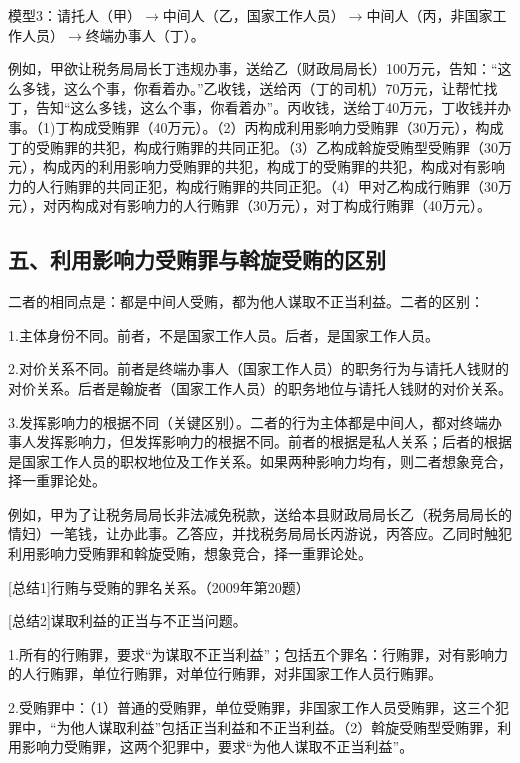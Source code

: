 模型3：请托人（甲）\ensuremath{\rightarrow}中间人（乙，国家工作人员）\ensuremath{\rightarrow}中间人（丙，非国家工作人员）\ensuremath{\rightarrow}终端办事人（丁）。

例如，甲欲让税务局局长丁违规办事，送给乙（财政局局长）100万元，告知：“这么多钱，这么个事，你看着办。”乙收钱，送给丙（丁的司机）70万元，让帮忙找丁，告知“这么多钱，这么个事，你看着办”。丙收钱，送给丁40万元，丁收钱并办事。（1)丁构成受贿罪（40万元）。（2）丙构成利用影响力受贿罪（30万元），构成丁的受贿罪的共犯，构成行贿罪的共同正犯。（3）乙构成斡旋受贿型受贿罪（30万元），构成丙的利用影响力受贿罪的共犯，构成丁的受贿罪的共犯，构成对有影响力的人行贿罪的共同正犯，构成行贿罪的共同正犯。（4）甲对乙构成行贿罪（30万元），对丙构成对有影响力的人行贿罪（30万元），对丁构成行贿罪（40万元）。

\subsection*{五、利用影响力受贿罪与斡旋受贿的区别}

二者的相同点是：都是中间人受贿，都为他人谋取不正当利益。二者的区别：

1.主体身份不同。前者，不是国家工作人员。后者，是国家工作人员。

2.对价关系不同。前者是终端办事人（国家工作人员）的职务行为与请托人钱财的对价关系。后者是翰旋者（国家工作人员）的职务地位与请托人钱财的对价关系。

3.发挥影响力的根据不同（关键区别）。二者的行为主体都是中间人，都对终端办事人发挥影响力，但发挥影响力的根据不同。前者的根据是私人关系；后者的根据是国家工作人员的职权地位及工作关系。如果两种影响力均有，则二者想象竞合，择一重罪论处。

例如，甲为了让税务局局长非法减免税款，送给本县财政局局长乙（税务局局长的情妇）一笔钱，让办此事。乙答应，并找税务局局长丙游说，丙答应。乙同时触犯利用影响力受贿罪和斡旋受贿，想象竞合，择一重罪论处。

[总结1]行贿与受贿的罪名关系。（2009年第20题）


[总结2]谋取利益的正当与不正当问题。

1.所有的行贿罪，要求“为谋取不正当利益”；包括五个罪名：行贿罪，对有影响力的人行贿罪，单位行贿罪，对单位行贿罪，对非国家工作人员行贿罪。

2.受贿罪中：（1）普通的受贿罪，单位受贿罪，非国家工作人员受贿罪，这三个犯罪中，“为他人谋取利益”包括正当利益和不正当利益。（2）斡旋受贿型受贿罪，利用影响力受贿罪，这两个犯罪中，要求“为他人谋取不正当利益”。

